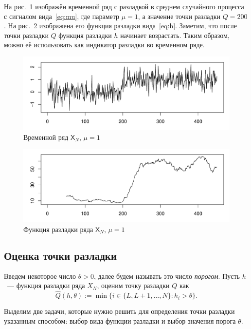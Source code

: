 \documentclass{math-mech-sci}
\newcommand{\X}{\mathsf X}
\begin{document}
На рис.~\ref{fig:x_mu_small} изображён временной ряд с разладкой в среднем случайного процесса с сигналом вида~\eqref{eq:mu}, где параметр $\mu=1$, а значение точки разладки $Q=200$.
На рис.~\ref{fig:e_mu_small} изображена его функция разладки вида~\eqref{eq:h}. Заметим, что после точки разладки $Q$ функция разладки $h$ начинает возрастать. Таким образом, можно её использовать как индикатор разладки во временном ряде.
\begin{figure}[h!]
	\includegraphics[width=\textwidth]{S_mu_small}\caption{Временной ряд $\X_N$, $\mu=1$}\label{fig:x_mu_small}
\end{figure}
\begin{figure}
	\includegraphics[width=\textwidth]{E_mu_small}\caption{Функция разладки ряда $\X_N$, $\mu=1$}\label{fig:e_mu_small}
\end{figure}

\subsection{Оценка точки разладки}
Введем некоторое число $\theta >0$, далее будем называть это число \textit{порогом}. Пусть $h$~--- функция разладки ряда $X_N$, оценим точку разладки $Q$ как
\begin{equation*}
\widehat Q(h,\theta):=\min\{i\in\{L,L+1,\ldots,N\}:h_i>\theta\}.
\end{equation*}

Выделим две задачи, которые нужно решить для определения точки разладки указанным способом: выбор вида функции разладки и выбор значения порога $\theta$.
\end{document}
